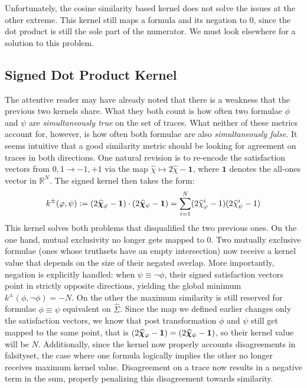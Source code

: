 \documentclass[titlepage,a4paper,11pt]{report}
\begin{document}
    Unfortunately, the cosine similarity based kernel does not solve the issues at the other extreme. This kernel still maps a formula and its negation to $0$, since the dot product is still the sole part of the numerator. We must look elsewhere for a solution to this problem.

    \subsection{Signed Dot Product Kernel}
    The attentive reader may have already noted that there is a weakness that the previous two kernels share. What they both count is how often two formulae $\phi$ and $\psi$ are \emph{simultaneously true} on the set of traces. What neither of these metrics account for, however, is how often both formulae are also \emph{simultaneously false}. It seems intuitive that a good similarity metric should be looking for agreement on traces in both directions. One natural revision is to re-encode the satisfaction vectors from ${0,1} \to {-1,+1}$ via the map $\widehat\chi \mapsto 2\widehat\chi - \mathbf{1}$, where $\mathbf{1}$ denotes the all-ones vector in $\mathbb{R}^N$. The signed kernel then takes the form:
    \begin{equation}\label{eq:pm_kernel}
        k^\pm(\varphi, \psi) := (2\bm{\widehat\chi}_\varphi - \mathbf{1}) \cdot (2\bm{\widehat\chi}_\psi - \mathbf{1}) = \sum^N_{i=1} (2 \widehat \chi^i_{\varphi} - 1) (2 \widehat \chi^i_{\psi} - 1)
    \end{equation}
    This kernel solves both problems that disqualified the two previous ones. On the one hand, mutual exclusivity no longer gets mapped to $0$. Two mutually exclusive formulae (ones whose truthsets have an empty intersection) now receive a kernel value that depends on the size of their negated overlap. More importantly, negation is explicitly handled: when $\psi \equiv \neg\phi$, their signed satisfaction vectors point in strictly opposite directions, yielding the global minimum $k^\pm(\phi, \neg\phi) = -N$. On the other the maximum similarity is still reserved for formulae $\phi \equiv \psi$ equivalent on $\widehat \Sigma$. Since the map we defined earlier changes only the satisfaction vectors, we know that post transformation $\phi$ and $\psi$ still get mapped to the same point, that is $(2\bm{\widehat\chi}_\varphi - \mathbf{1}) = (2\bm{\widehat\chi}_\psi - \mathbf{1})$, so their kernel value will be $N$. Additionally, since the kernel now properly accounts disagreements in falsityset, the case where one formula logically implies the other no longer receives maximum kernel value. Disagreement on a trace now results in a negative term in the sum, properly penalizing this disagreement towards similarity. 
\end{document}
